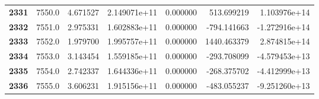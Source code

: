 \documentclass{report}[12pt]
\begin{document}
\begin{center}
\begin{tabular}{lrrrrrr}
\textbf{2331} &         7550.0 &   4.671527 &  2.149071e+11 &    0.000000 &   513.699219 &  1.103976e+14 \\
\textbf{2332} &         7551.0 &   2.975331 &  1.602883e+11 &    0.000000 &  -794.141663 & -1.272916e+14 \\
\textbf{2333} &         7552.0 &   1.979700 &  1.995757e+11 &    0.000000 &  1440.463379 &  2.874815e+14 \\
\textbf{2334} &         7553.0 &   3.143454 &  1.559185e+11 &    0.000000 &  -293.708099 & -4.579453e+13 \\
\textbf{2335} &         7554.0 &   2.742337 &  1.644336e+11 &    0.000000 &  -268.375702 & -4.412999e+13 \\
\textbf{2336} &         7555.0 &   3.606231 &  1.915156e+11 &    0.000000 &  -483.055237 & -9.251260e+13 \\
\bottomrule
\end{tabular}
\end{center}
\end{document}
